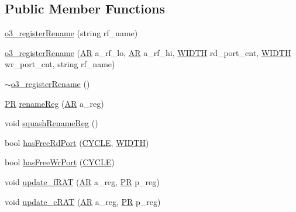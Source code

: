 \subsection*{Public Member Functions}
\begin{DoxyCompactItemize}
\item 
\hyperlink{classo3__registerRename_afc40fa21233d279d229970c3a982a9b8}{o3\_\-registerRename} (string rf\_\-name)
\item 
\hyperlink{classo3__registerRename_a177992bb922a67442166f5cc0a1c09fe}{o3\_\-registerRename} (\hyperlink{global_2global_8h_a735ca3cb7fa17e60af6701a846722516}{AR} a\_\-rf\_\-lo, \hyperlink{global_2global_8h_a735ca3cb7fa17e60af6701a846722516}{AR} a\_\-rf\_\-hi, \hyperlink{global_2global_8h_a6fa2e24b8a418fa215e183264cbea3aa}{WIDTH} rd\_\-port\_\-cnt, \hyperlink{global_2global_8h_a6fa2e24b8a418fa215e183264cbea3aa}{WIDTH} wr\_\-port\_\-cnt, string rf\_\-name)
\item 
\hyperlink{classo3__registerRename_ad8e4b3165b84c89ba73d622c58f8b65f}{$\sim$o3\_\-registerRename} ()
\item 
\hyperlink{global_2global_8h_a54dcae2ba04c76c12afe113b706bd4dc}{PR} \hyperlink{classo3__registerRename_a1e65eca8eb066cf294a056d015469992}{renameReg} (\hyperlink{global_2global_8h_a735ca3cb7fa17e60af6701a846722516}{AR} a\_\-reg)
\item 
void \hyperlink{classo3__registerRename_a72f6bb205743c3bbbe41c47584208c90}{squashRenameReg} ()
\item 
bool \hyperlink{classo3__registerRename_a641c81a3e668177ef756fbeaa7c0998f}{hasFreeRdPort} (\hyperlink{global_2global_8h_a7e19a550ec11d1ed921deb20c22efb5b}{CYCLE}, \hyperlink{global_2global_8h_a6fa2e24b8a418fa215e183264cbea3aa}{WIDTH})
\item 
bool \hyperlink{classo3__registerRename_aad6b322839a5349fd6895944f3907ff2}{hasFreeWrPort} (\hyperlink{global_2global_8h_a7e19a550ec11d1ed921deb20c22efb5b}{CYCLE})
\item 
void \hyperlink{classo3__registerRename_ac29d3ca88b64d065d8f52b4384895c4b}{update\_\-fRAT} (\hyperlink{global_2global_8h_a735ca3cb7fa17e60af6701a846722516}{AR} a\_\-reg, \hyperlink{global_2global_8h_a54dcae2ba04c76c12afe113b706bd4dc}{PR} p\_\-reg)
\item 
void \hyperlink{classo3__registerRename_af8f4e3c178f20fbee9a17d5781cd8f84}{update\_\-cRAT} (\hyperlink{global_2global_8h_a735ca3cb7fa17e60af6701a846722516}{AR} a\_\-reg, \hyperlink{global_2global_8h_a54dcae2ba04c76c12afe113b706bd4dc}{PR} p\_\-reg)
\item 

\end{DoxyCompactItemize}
